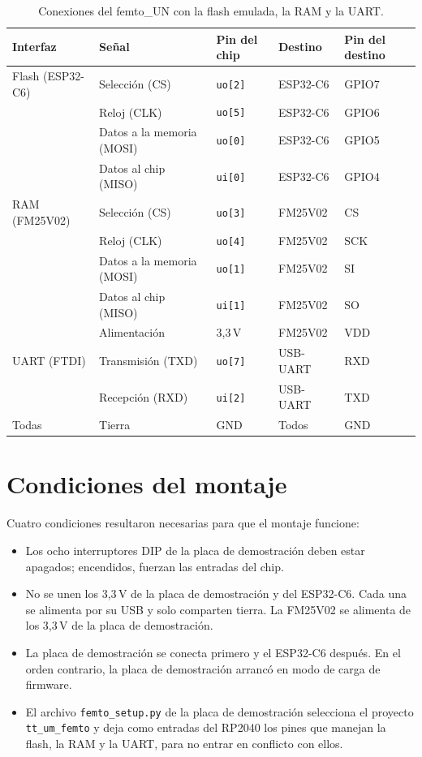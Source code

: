 \documentclass[11pt,letterpaper,oneside]{report}
\newcommand{\code}[1]{\texttt{#1}}
\begin{document}
\begin{table}[htbp]
\centering
\caption{Conexiones del femto\_UN con la flash emulada, la RAM y la UART.}
\label{tab:conexiones}
{\small
\begin{tabular}{l l l l l}
\toprule
\textbf{Interfaz} & \textbf{Señal} & \textbf{Pin del chip} & \textbf{Destino} & \textbf{Pin del destino} \\
\midrule
Flash (ESP32-C6) & Selección (CS)      & \code{uo[2]} & ESP32-C6 & GPIO7 \\
                 & Reloj (CLK)         & \code{uo[5]} & ESP32-C6 & GPIO6 \\
                 & Datos a la memoria (MOSI) & \code{uo[0]} & ESP32-C6 & GPIO5 \\
                 & Datos al chip (MISO)& \code{ui[0]} & ESP32-C6 & GPIO4 \\
\midrule
RAM (FM25V02)    & Selección (CS)      & \code{uo[3]} & FM25V02 & CS \\
                 & Reloj (CLK)         & \code{uo[4]} & FM25V02 & SCK \\
                 & Datos a la memoria (MOSI) & \code{uo[1]} & FM25V02 & SI \\
                 & Datos al chip (MISO)& \code{ui[1]} & FM25V02 & SO \\
                 & Alimentación        & 3,3\,V       & FM25V02 & VDD \\
\midrule
UART (FTDI)      & Transmisión (TXD)   & \code{uo[7]} & USB-UART & RXD \\
                 & Recepción (RXD)     & \code{ui[2]} & USB-UART & TXD \\
\midrule
Todas            & Tierra              & GND          & Todos    & GND \\
\bottomrule
\end{tabular}
}
\end{table}

\section{Condiciones del montaje}

Cuatro condiciones resultaron necesarias para que el montaje funcione:

\begin{itemize}
  \item Los ocho interruptores DIP de la placa de demostración deben estar apagados; encendidos, fuerzan las entradas del chip.
  \item No se unen los 3,3\,V de la placa de demostración y del ESP32-C6. Cada una se alimenta por su USB y solo comparten tierra. La FM25V02 se alimenta de los 3,3\,V de la placa de demostración.
  \item La placa de demostración se conecta primero y el ESP32-C6 después. En el orden contrario, la placa de demostración arrancó en modo de carga de firmware.
  \item El archivo \code{femto\_setup.py} de la placa de demostración selecciona el proyecto \code{tt\_um\_femto} y deja como entradas del RP2040 los pines que manejan la flash, la RAM y la UART, para no entrar en conflicto con ellos.
\end{itemize}
\end{document}
